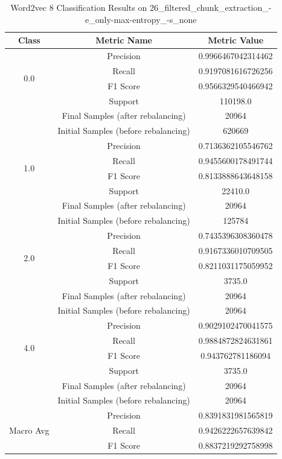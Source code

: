 \begin{longtable}{|c|c|c|}
\caption{Word2vec 8 Classification Results on 26\_filtered\_chunk\_extraction\_-e\_only-max-entropy\_-s\_none} \label{tab:26_filtered_chunk_extraction_-e_only-max-entropy_-s_none_word2vec_8_classifiers_results} \\
\hline
Class & Metric Name & Metric Value \\
\hline
\multirow{4}{*}{0.0} & Precision & 0.9966467042314462 \\
 & Recall & 0.9197081616726256 \\
 & F1 Score & 0.9566329540466942 \\
 & Support & 110198.0 \\
 & Final Samples (after rebalancing) & 20964 \\
 & Initial Samples (before rebalancing) & 620669 \\
\hline
\multirow{4}{*}{1.0} & Precision & 0.7136362105546762 \\
 & Recall & 0.9455600178491744 \\
 & F1 Score & 0.8133888643648158 \\
 & Support & 22410.0 \\
 & Final Samples (after rebalancing) & 20964 \\
 & Initial Samples (before rebalancing) & 125784 \\
\hline
\multirow{4}{*}{2.0} & Precision & 0.7435396308360478 \\
 & Recall & 0.9167336010709505 \\
 & F1 Score & 0.8211031175059952 \\
 & Support & 3735.0 \\
 & Final Samples (after rebalancing) & 20964 \\
 & Initial Samples (before rebalancing) & 20964 \\
\hline
\multirow{4}{*}{4.0} & Precision & 0.9029102470041575 \\
 & Recall & 0.9884872824631861 \\
 & F1 Score & 0.943762781186094 \\
 & Support & 3735.0 \\
 & Final Samples (after rebalancing) & 20964 \\
 & Initial Samples (before rebalancing) & 20964 \\
\hline
\multirow{4}{*}{Macro Avg} & Precision & 0.8391831981565819 \\
 & Recall & 0.9426222657639842 \\
 & F1 Score & 0.8837219292758998 \\

\end{longtable}
